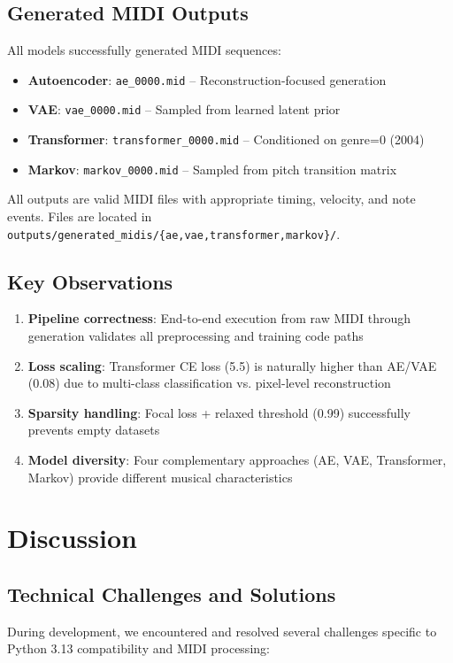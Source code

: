 \documentclass[conference]{IEEEtran}
\begin{document}
\subsection{Generated MIDI Outputs}
All models successfully generated MIDI sequences:
\begin{itemize}
    \item \textbf{Autoencoder}: \texttt{ae\_0000.mid} -- Reconstruction-focused generation
    \item \textbf{VAE}: \texttt{vae\_0000.mid} -- Sampled from learned latent prior
    \item \textbf{Transformer}: \texttt{transformer\_0000.mid} -- Conditioned on genre=0 (2004)
    \item \textbf{Markov}: \texttt{markov\_0000.mid} -- Sampled from pitch transition matrix
\end{itemize}

All outputs are valid MIDI files with appropriate timing, velocity, and note events. Files are located in \texttt{outputs/generated\_midis/\{ae,vae,transformer,markov\}/}.

\subsection{Key Observations}
\begin{enumerate}
    \item \textbf{Pipeline correctness}: End-to-end execution from raw MIDI through generation validates all preprocessing and training code paths
    \item \textbf{Loss scaling}: Transformer CE loss (5.5) is naturally higher than AE/VAE (0.08) due to multi-class classification vs. pixel-level reconstruction
    \item \textbf{Sparsity handling}: Focal loss + relaxed threshold (0.99) successfully prevents empty datasets
    \item \textbf{Model diversity}: Four complementary approaches (AE, VAE, Transformer, Markov) provide different musical characteristics
\end{enumerate}

\section{Discussion}

\subsection{Technical Challenges and Solutions}
During development, we encountered and resolved several challenges specific to Python 3.13 compatibility and MIDI processing:
\end{document}
